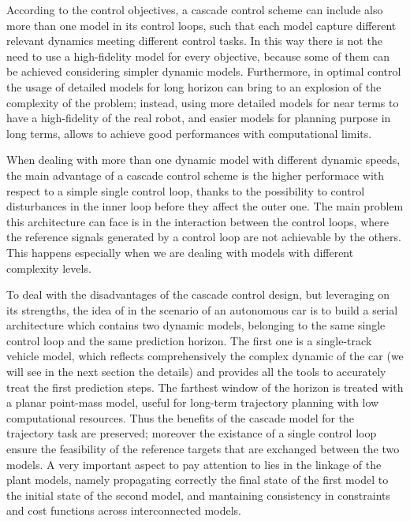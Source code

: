 \documentclass[a4paper, onecolumn, 12pt]{article}
\begin{document}
According to the control objectives, a cascade control scheme can include also 
more than one model in its control loops, such that each model capture different
relevant dynamics meeting different control tasks. In this way there is not the 
need to use a high-fidelity model for every objective, because some of them can 
be achieved considering simpler dynamic models. Furthermore, in optimal control
the usage of detailed models for long horizon can bring to an explosion of the 
complexity of the problem; instead, using more detailed models for near terms 
to have a high-fidelity of the real robot, and easier models for planning purpose
in long terms, allows to achieve good performances with computational limits.

When dealing with more than one dynamic model with different dynamic speeds,
the main advantage of a cascade control scheme is the higher performace with respect
to a simple single control loop, thanks to the possibility to control disturbances
in the inner loop before they affect the outer one. The main problem this architecture
can face is in the interaction between the control loops, where the reference signals 
generated by a control loop are not achievable by the others. This happens especially
when we are dealing with models with different complexity levels.

To deal with the disadvantages of the cascade control design, but leveraging on
its strengths, the idea of \cite{paper} in the scenario of an autonomous car is
to build a serial architecture which contains two dynamic models, belonging to
the same single control loop and the same prediction horizon. The first one is a
single-track vehicle model, which reflects comprehensively the complex dynamic
of the car (we will see in the next section the details) and provides all the
tools to accurately treat the first prediction steps. The farthest window of the
horizon is treated with a planar point-mass model, useful for long-term
trajectory planning with low computational resources. Thus the benefits of the
cascade model for the trajectory task are preserved; moreover the existance of a
single control loop ensure the feasibility of the reference targets that are
exchanged between the two models. A very important aspect to pay attention to
lies in the linkage of the plant models, namely propagating correctly the final
state of the first model to the initial state of the second model, and
mantaining consistency in constraints and cost functions across interconnected
models. 
\end{document}
